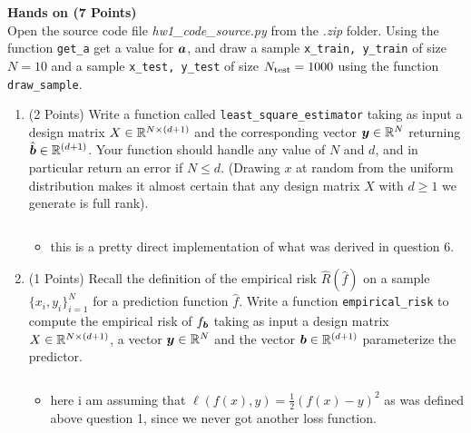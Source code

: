 \documentclass{article}
\newcommand{\bb}{b}
\begin{document}
\textbf{\color{nyupurple} Hands on (7 Points)}\\
Open the source code file \emph{hw1\_code\_source.py} from the \emph{.zip} folder. Using the function \texttt{get\_a}  get a value for $\boldsymbol{a}$, and draw a sample \texttt{x\_train, y\_train} of size $N=10$ and a sample \texttt{x\_test, y\_test} of size $N_{\rm test}=1000$ using the function \texttt{draw\_sample}.

\begin{enumerate}

\setcounter{enumi}{\value{saveenum}}
    \item (2 Points) Write a function called \texttt{least\_square\_estimator} taking as input a design matrix $X \in {\mathbb{R}}^{N \times (d + 1)}$ and the corresponding vector  $\boldsymbol{y} \in {\mathbb{R}}^N$ returning $\hat{\boldsymbol{b}} \in {\mathbb{R}}^{(d + 1)}$. Your function should handle any value of $N$ and $d$, and in particular return an error if $N \leq d$. (Drawing $x$ at random from the uniform distribution makes it almost certain that any design matrix $X$ with $d \geq 1$ we generate is full rank).
\inputminted[firstline=58, lastline=67, breaklines=True]{python}{hw1_code_source.py}
\begin{itemize}
\item this is a pretty direct implementation of what was derived in question 6. 

\end{itemize}

    
    \item (1 Points) Recall the definition of the empirical risk $\hat{R}(\hat{f})$ on a sample $\{x_i, y_i\}_{i=1}^N$ for a prediction function $\hat{f}$. Write a function \texttt{empirical\_risk} to compute the empirical risk of $f_{\bs \bb}$ taking as input a design matrix $X \in {\mathbb{R}}^{N \times (d + 1)}$, a vector $\boldsymbol{y} \in {\mathbb{R}}^N$ and the vector  $\bs \bb \in \sR^{(d+1)}$ parameterize the predictor.
    \inputminted[firstline=68, lastline=77, breaklines=True]{python}{hw1_code_source.py}
\begin{itemize} 
    \item here i am assuming that $\ell(f(x),y)=\frac{1}{2}(f(x)-y)^2$ as was defined above question  1, since we never got another loss function. 


\end{itemize}


\end{enumerate}
\end{document}
